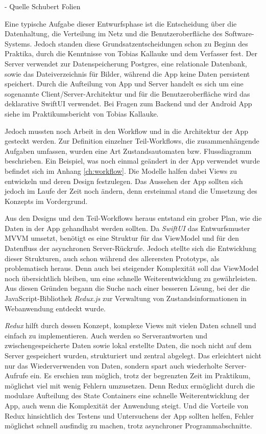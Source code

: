 \documentclass[nomenclature, oneside, 150]{HSMW-Thesis}
\begin{document}
		- Quelle Schubert Folien
		
		Eine typische Aufgabe dieser Entwurfsphase ist die Entscheidung über die Datenhaltung, die Verteilung im Netz und die Benutzeroberfläche des Software-Systems. Jedoch standen diese Grundsatzentscheidungen schon zu Beginn des Praktika, durch die Kenntnisse von Tobias Kallauke und dem Verfasser fest. Der Server verwendet zur Datenspeicherung Postgres, eine relationale Datenbank, sowie das Dateiverzeichnis für Bilder, während die App keine Daten persistent speichert. Durch die Aufteilung von App und Server handelt es sich um eine sogenannte Client/Server-Architektur und für die Benutzeroberfläche wird das deklarative SwiftUI verwendet. Bei Fragen zum Backend und der Android App siehe im Praktikumsbericht von Tobias Kallauke.
		
		Jedoch mussten noch Arbeit in den Workflow und in die Architektur der App gesteckt werden. Zur Definition einzelner Teil-Workflows, die zusammenhängende Aufgaben umfassen, wurden eine Art Zustandsautomaten bzw. Flussdiagramm beschrieben. Ein Beispiel, was noch einmal geändert in der App verwendet wurde befindet sich im Anhang \ref{ch:workflow}. Die Modelle halfen dabei Views zu entwickeln und deren Design festzulegen. Das Aussehen der App sollten sich jedoch im Laufe der Zeit noch ändern, denn ersteinmal stand die Umsetzung des Konzepts im Vordergrund.

		Aus den Designs und den Teil-Workflows heraus entstand ein grober Plan, wie die Daten in der App gehandhabt werden sollten. Da \textit{SwiftUI} das Entwurfsmuster MVVM umsetzt, benötigt es eine Struktur für das ViewModel und für den Datenfluss der asynchronen Server-Rückrufe. Jedoch stellte sich die Entwicklung dieser Strukturen, auch schon während des allerersten Prototyps, als problematisch heraus. Denn auch bei steigender Komplexität soll das ViewModel noch übersichtlich bleiben, um eine schnelle Weiterentwicklung zu gewährleisten. Aus diesen Gründen begann die Suche nach einer besseren Lösung, bei der die JavaScript-Bibliothek \textit{Redux.js} zur Verwaltung von Zustandsinformationen in Webanwendung entdeckt wurde. 

		\textit{Redux} hilft durch dessen Konzept, komplexe Views mit vielen Daten schnell und einfach zu implementieren. Auch werden so Serverantworten und zwischengespeicherte Daten sowie lokal erstellte Daten, die noch nicht auf dem Server gespeichert wurden, strukturiert und zentral abgelegt. Das erleichtert nicht nur das Wiederverwenden von Daten, sondern spart auch wiederholte Server-Aufrufe ein. Es erschien nun möglich, trotz der begrenzten Zeit im Praktikum, möglichst viel mit wenig Fehlern umzusetzen. Denn Redux ermöglicht durch die modulare Aufteilung des State Containers eine schnelle Weiterentwicklung der App, auch wenn die Komplexität der Anwendung steigt. Und die Vorteile von Redux hinsichtlich des Testens und Untersuchens der App sollten helfen, Fehler möglichst schnell ausfindig zu machen, trotz asynchroner Programmabschnitte.
\end{document}

